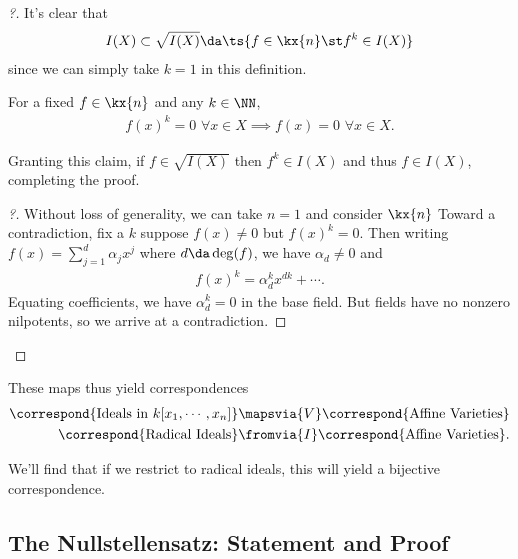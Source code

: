 \begin{proof}[?]

It's clear that
\begin{align*}
I(X) \subset \sqrt{I(X)} \da \ts{f\in \kx{n} \st f^k \in I(X)}
\end{align*} since we can simply take \(k=1\) in this definition.

\begin{claim}

For a fixed \(f\in \kx{n}\) and any \(k\in \NN\),
\begin{align*}  
f(x)^k = 0\,\, \forall x\in X \implies f(x) = 0\,\, \forall x\in X
.\end{align*}

\end{claim}

Granting this claim, if \(f\in \sqrt{I(X)}\) then \(f^k \in I(X)\) and
thus \(f\in I(X)\), completing the proof.

\begin{proof}[?]

Without loss of generality, we can take \(n = 1\) and consider
\(\kx{n}\) Toward a contradiction, fix a \(k\) suppose \(f(x) \neq 0\)
but \(f(x)^k = 0\). Then writing \(f(x) = \sum_{j=1}^d \alpha_j x^j\)
where \(d \da \deg(f)\), we have \(\alpha_d \neq 0\) and
\begin{align*}  
f(x)^k = \alpha_d^k x^{dk} + \cdots
.\end{align*} Equating coefficients, we have \(\alpha_d^k = 0\) in the
base field. But fields have no nonzero nilpotents, so we arrive at a
contradiction.

\end{proof}

\end{proof}

These maps thus yield correspondences
\begin{align*}  
\correspond{\text{Ideals in } k[x_1, \cdots, x_n]} &\mapsvia{V} \correspond{\text{Affine Varieties}} \\
\correspond{\text{Radical Ideals}} &\fromvia{I} \correspond{\text{Affine Varieties}}
.\end{align*}

We'll find that if we restrict to radical ideals, this will yield a
bijective correspondence.

\hypertarget{the-nullstellensatz-statement-and-proof}{%
\subsection{The Nullstellensatz: Statement and
Proof}\label{the-nullstellensatz-statement-and-proof}}

